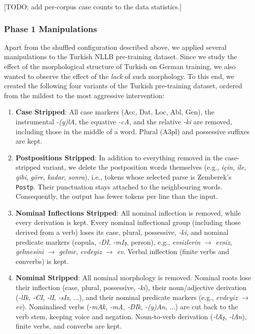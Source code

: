 \documentclass[11pt]{article}
\begin{document}
[TODO: add per-corpus case counts to the data statistics.]

\subsubsection{Phase 1 Manipulations}

Apart from the shuffled configuration described above, we applied several manipulations to the Turkish NLLB pre-training dataset. Since we study the effect of the morphological structure of Turkish on German training, we also wanted to observe the effect of the \emph{lack} of such morphology. To this end, we created the following four variants of the Turkish pre-training dataset, ordered from the mildest to the most aggressive intervention:
\begin{enumerate}
    \item \textbf{Case Stripped}: All case markers (Acc, Dat, Loc, Abl, Gen), the instrumental \textit{-(y)lA}, the equative \textit{-cA}, and the relative \textit{-ki} are removed, including those in the middle of a word. Plural (A3pl) and possessive suffixes are kept.
    \item \textbf{Postpositions Stripped}: In addition to everything removed in the case-stripped variant, we delete the postposition words themselves (e.g., \textit{için}, \textit{ile}, \textit{gibi}, \textit{göre}, \textit{kadar}, \textit{sonra}), i.e., tokens whose selected parse is Zemberek's \texttt{Postp}. Their punctuation stays attached to the neighbouring words. Consequently, the output has fewer tokens per line than the input.
    \item \textbf{Nominal Inflections Stripped}: All nominal inflection is removed, while every derivation is kept. Every nominal inflectional group (including those derived from a verb) loses its case, plural, possessive, \textit{-ki}, and nominal predicate markers (copula, \textit{-DI}, \textit{-mIş}, person), e.g., \textit{evsizlerin} $\rightarrow$ \textit{evsiz}, \textit{gelmesini} $\rightarrow$ \textit{gelme}, \textit{evdeyiz} $\rightarrow$ \textit{ev}. Verbal inflection (finite verbs and converbs) is kept.
    \item \textbf{Nominal Stripped}: All nominal morphology is removed. Nominal roots lose their inflection (case, plural, possessive, \textit{-ki}), their noun/adjective derivation (\textit{-lIk}, \textit{-CI}, \textit{-lI}, \textit{-sIz}, ...), and their nominal predicate markers (e.g., \textit{evdeyiz} $\rightarrow$ \textit{ev}). Nominalised verbs (\textit{-mAk}, \textit{-mA}, \textit{-DIk}, \textit{-(y)An}, ...) are cut back to the verb stem, keeping voice and negation. Noun-to-verb derivation (\textit{-lAş}, \textit{-lAn}), finite verbs, and converbs are kept.
\end{enumerate}
\end{document}
